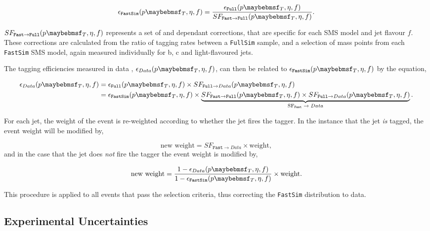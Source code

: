 \begin{equation}
\epsilon_{\texttt{FastSim}}(\pt,\eta,f) =  \frac{\epsilon_{\texttt{Full}}(\pt,\eta,f)}{SF_{\texttt{Fast}\rightarrow\texttt{Full}}(\pt,\eta,f)}.
\end{equation}

$SF_{\texttt{Fast}\rightarrow\texttt{Full}}(\pt,\eta,f)$ represents a set of \pt and \eta dependant corrections, that are specific for each \ac{SMS} model and jet flavour $f$. These corrections are calculated from the ratio of tagging rates between a \texttt{FullSim} \ttbar sample, and a selection of mass points from each \texttt{FastSim} \ac{SMS} model, again measured individually for b, c and light-flavoured jets. 

The tagging efficiencies measured in data \cite{btagscalefactor}, $\epsilon_{Data}(\pt,\eta,f)$,  can then be related to $\epsilon_{\texttt{FastSim}}(\pt,\eta,f)$ by the equation,

\begin{align}
\epsilon_{Data}(\pt,\eta,f) &=  \epsilon_{\texttt{Full}}(\pt,\eta,f) \times SF_{\texttt{Full}\rightarrow Data}(\pt,\eta,f) \nonumber \\
&=  \epsilon_{\texttt{FastSim}}(\pt,\eta,f) \times \underbrace{SF_{\texttt{Fast}\rightarrow\texttt{Full}}(\pt,\eta,f) \times SF_{\texttt{Full}\rightarrow Data}(\pt,\eta,f)}_\text{SF$_{\texttt{Fast}} \rightarrow Data$}.
\end{align}

For each jet, the weight of the event is re-weighted according to whether the jet fires the tagger. In the instance that the jet \emph{is} tagged, the event weight will be modified by,

\begin{equation}
\text{new weight} = SF_{\texttt{Fast} \rightarrow Data} \times \text{weight},
\end{equation} 
and in the case that the jet does \emph{not} fire the tagger the event weight is modified by,

\begin{equation}
\text{new weight} = \frac{1-\epsilon_{Data}(\pt,\eta,f)}{1- \epsilon_{\texttt{FastSim}}(\pt,\eta,f)}\times \text{weight}.
\end{equation}

This procedure is applied to all events that pass the selection criteria, thus correcting the \texttt{FastSim} \nbreco distribution to data. 

\subsection{Experimental Uncertainties}

